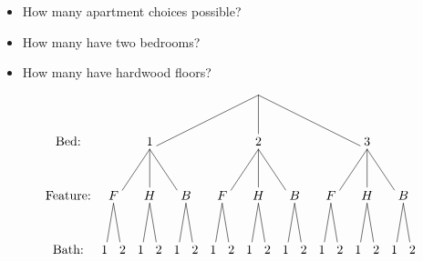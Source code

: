 \documentclass{beamer}
\theoremstyle{definition}
\begin{document}
\begin{frame}
\begin{itemize}
\item How many apartment choices possible?
\item How many have two bedrooms?
\item How many have hardwood floors?
\end{itemize}
\[\begin{xy}<.5cm,0cm>:
(8.5,0)="0";
(2.5,-3)="1";
(8.5,-3)="2";
(14.5,-3)="3";
"0";"1"*+!D{1}**\dir{-};
"0";"2"*+!D{2}**\dir{-};
"0";"3"*+!D{3}**\dir{-};
(.5,-6)="11";
(2.5,-6)="12";
(4.5,-6)="13";
(6.5,-6)="21";
(8.5,-6)="22";
(10.5,-6)="23";
(12.5,-6)="31";
(14.5,-6)="32";
(16.5,-6)="33";
"1";"11"*+!D{F}**\dir{-};
"1";"12"*+!D{H}**\dir{-};
"1";"13"*+!D{B}**\dir{-};
"2";"21"*+!D{F}**\dir{-};
"2";"22"*+!D{H}**\dir{-};
"2";"23"*+!D{B}**\dir{-};
"3";"31"*+!D{F}**\dir{-};
"3";"32"*+!D{H}**\dir{-};
"3";"33"*+!D{B}**\dir{-};
"11";(0,-9)*+!D{1}**\dir{-};
"11";(1,-9)*+!D{2}**\dir{-};
"12";(2,-9)*+!D{1}**\dir{-};
"12";(3,-9)*+!D{2}**\dir{-};
"13";(4,-9)*+!D{1}**\dir{-};
"13";(5,-9)*+!D{2}**\dir{-};
"21";(6,-9)*+!D{1}**\dir{-};
"21";(7,-9)*+!D{2}**\dir{-};
"22";(8,-9)*+!D{1}**\dir{-};
"22";(9,-9)*+!D{2}**\dir{-};
"23";(10,-9)*+!D{1}**\dir{-};
"23";(11,-9)*+!D{2}**\dir{-};
"31";(12,-9)*+!D{1}**\dir{-};
"31";(13,-9)*+!D{2}**\dir{-};
"32";(14,-9)*+!D{1}**\dir{-};
"32";(15,-9)*+!D{2}**\dir{-};
"33";(16,-9)*+!D{1}**\dir{-};
"33";(17,-9)*+!D{2}**\dir{-};
(-2,-3)*+!D{\text{Bed:}};
(-2,-6)*+!D{\text{Feature:}};
(-2,-9)*+!D{\text{Bath:}};
\end{xy}\]
\end{frame}
\end{document}
